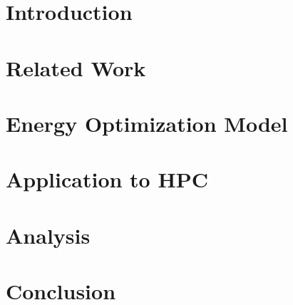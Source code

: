 \documentclass{acm_proc_article-sp}
\begin{document}

\begin{abstract}

\end{abstract}

\section{Introduction}
\label{intro}


\section{Related Work}
\label{related_work}


%

\section{Energy Optimization Model}
\label{model}


\section{Application to HPC}
\label{application_to_hpc}


\section{Analysis}
\label{analysis}


\section{Conclusion}
\label{conclusion}



%

\end{document}
